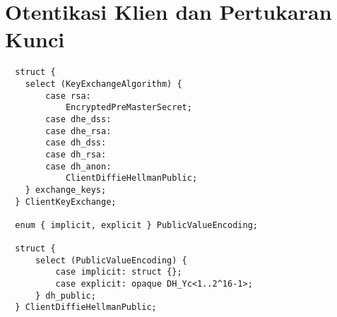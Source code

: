 \section{Otentikasi Klien dan Pertukaran Kunci}

\begin{verbatim}
  struct {
    select (KeyExchangeAlgorithm) {
        case rsa:
            EncryptedPreMasterSecret;
        case dhe_dss:
        case dhe_rsa:
        case dh_dss:
        case dh_rsa:
        case dh_anon:
            ClientDiffieHellmanPublic;
    } exchange_keys;
  } ClientKeyExchange;

  enum { implicit, explicit } PublicValueEncoding;

  struct {
      select (PublicValueEncoding) {
          case implicit: struct {};
          case explicit: opaque DH_Yc<1..2^16-1>;
      } dh_public;
  } ClientDiffieHellmanPublic;


\end{verbatim}